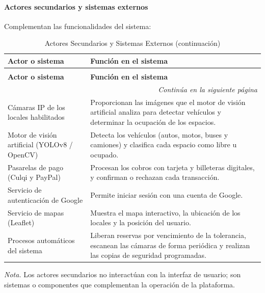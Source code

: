 \newpage\paragraph{Actores secundarios y sistemas externos} Complementan las funcionalidades del sistema:

\begin{longtable}{p{4.5cm} p{9.5cm}}
\caption{Actores Secundarios y Sistemas Externos} \\
\toprule
\textbf{Actor o sistema} & \textbf{Función en el sistema} \\
\midrule
\endfirsthead

\caption[]{Actores Secundarios y Sistemas Externos (continuación)} \\
\toprule
\textbf{Actor o sistema} & \textbf{Función en el sistema} \\
\midrule
\endhead

\midrule
\multicolumn{2}{r}{\footnotesize\textit{Continúa en la siguiente página}} \\
\endfoot

\bottomrule
\endlastfoot

Cámaras IP de los locales habilitados & Proporcionan las imágenes que el motor de visión artificial analiza para detectar vehículos y determinar la ocupación de los espacios. \\
\midrule
Motor de visión artificial (YOLOv8 / OpenCV) & Detecta los vehículos (autos, motos, buses y camiones) y clasifica cada espacio como libre u ocupado. \\
\midrule
Pasarelas de pago (Culqi y PayPal) & Procesan los cobros con tarjeta y billeteras digitales, y confirman o rechazan cada transacción. \\
\midrule
Servicio de autenticación de Google & Permite iniciar sesión con una cuenta de Google. \\
\midrule
Servicio de mapas (Leaflet) & Muestra el mapa interactivo, la ubicación de los locales y la posición del usuario. \\
\midrule
Procesos automáticos del sistema & Liberan reservas por vencimiento de la tolerancia, escanean las cámaras de forma periódica y realizan las copias de seguridad programadas. \\
\end{longtable}

\textit{Nota.} Los actores secundarios no interactúan con la interfaz de usuario; son sistemas o componentes que complementan la operación de la plataforma.

